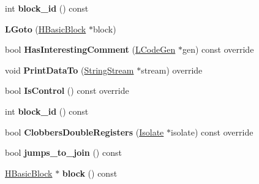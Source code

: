 \begin{DoxyCompactItemize}
\item 
int {\bfseries block\+\_\+id} () const \hypertarget{classv8_1_1internal_1_1_l_goto_a232c7b24fbe5cb48aa50908fe3d26626}{}\label{classv8_1_1internal_1_1_l_goto_a232c7b24fbe5cb48aa50908fe3d26626}

\item 
{\bfseries L\+Goto} (\hyperlink{classv8_1_1internal_1_1_h_basic_block}{H\+Basic\+Block} $\ast$block)\hypertarget{classv8_1_1internal_1_1_l_goto_a508956b700f4a115d2ae81e5c81b6d52}{}\label{classv8_1_1internal_1_1_l_goto_a508956b700f4a115d2ae81e5c81b6d52}

\item 
bool {\bfseries Has\+Interesting\+Comment} (\hyperlink{classv8_1_1internal_1_1_l_code_gen}{L\+Code\+Gen} $\ast$gen) const  override\hypertarget{classv8_1_1internal_1_1_l_goto_ae2dcadae50f2f182e7f9d772a170fe7b}{}\label{classv8_1_1internal_1_1_l_goto_ae2dcadae50f2f182e7f9d772a170fe7b}

\item 
void {\bfseries Print\+Data\+To} (\hyperlink{classv8_1_1internal_1_1_string_stream}{String\+Stream} $\ast$stream) override\hypertarget{classv8_1_1internal_1_1_l_goto_a42fa9224cfb4df48322ebdcf082ab6db}{}\label{classv8_1_1internal_1_1_l_goto_a42fa9224cfb4df48322ebdcf082ab6db}

\item 
bool {\bfseries Is\+Control} () const  override\hypertarget{classv8_1_1internal_1_1_l_goto_a4d45f583f9f81949e0ec9ab82d0a4dd1}{}\label{classv8_1_1internal_1_1_l_goto_a4d45f583f9f81949e0ec9ab82d0a4dd1}

\item 
int {\bfseries block\+\_\+id} () const \hypertarget{classv8_1_1internal_1_1_l_goto_a232c7b24fbe5cb48aa50908fe3d26626}{}\label{classv8_1_1internal_1_1_l_goto_a232c7b24fbe5cb48aa50908fe3d26626}

\item 
bool {\bfseries Clobbers\+Double\+Registers} (\hyperlink{classv8_1_1internal_1_1_isolate}{Isolate} $\ast$isolate) const  override\hypertarget{classv8_1_1internal_1_1_l_goto_a1185b3211324a679a73448732f2610c4}{}\label{classv8_1_1internal_1_1_l_goto_a1185b3211324a679a73448732f2610c4}

\item 
bool {\bfseries jumps\+\_\+to\+\_\+join} () const \hypertarget{classv8_1_1internal_1_1_l_goto_ad20f4da1f305aa9b9c7f33355bb7203f}{}\label{classv8_1_1internal_1_1_l_goto_ad20f4da1f305aa9b9c7f33355bb7203f}

\item 
\hyperlink{classv8_1_1internal_1_1_h_basic_block}{H\+Basic\+Block} $\ast$ {\bfseries block} () const \hypertarget{classv8_1_1internal_1_1_l_goto_a733437d298104ae3971337932f00605c}{}\label{classv8_1_1internal_1_1_l_goto_a733437d298104ae3971337932f00605c}

\end{DoxyCompactItemize}
